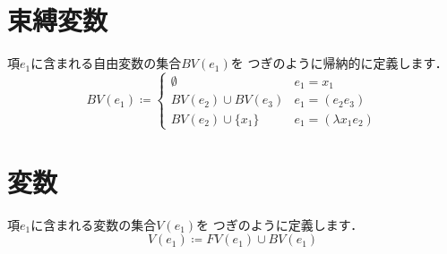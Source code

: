 \documentclass{ltjsbook}%
\begin{document}
\section{束縛変数}%
\label{untyped:bv}%
項$\mathit{e}_1$に含まれる自由変数の集合$BV(\mathit{e}_1)$を%
つぎのように帰納的に定義します．%
\begin{equation}%
  BV(\mathit{e}_1) \coloneqq \begin{cases}%
    \emptyset & \mathit{e}_1 = \mathit{x}_1\\%
    BV(\mathit{e}_2)\cup BV(\mathit{e}_3)%
    & \mathit{e}_1 = (\mathit{e}_2\mathit{e}_3)\\%
    BV(\mathit{e}_2)\cup\{\mathit{x}_1\}%
    & \mathit{e}_1 = (\lambda\mathit{x}_1\mathit{e}_2)%
  \end{cases}%
\end{equation}%
\section{変数}%
\label{untyped:v}%
項$\mathit{e}_1$に含まれる変数の集合$V(\mathit{e}_1)$を%
つぎのように定義します．%
\begin{equation}%
  V(\mathit{e}_1) \coloneqq FV(\mathit{e}_1)\cup BV(\mathit{e}_1)%
\end{equation}%
\end{document}
